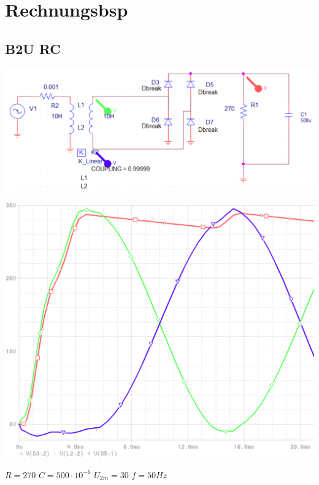 \section{Rechnungsbsp}
\subsection{B2U RC}
\begin{minipage}{0.4\linewidth}
    \includegraphics[width=\linewidth]{images/Rechnungsbsp/B2URC}
\end{minipage}
\begin{minipage}{0.2\linewidth}
    \includegraphics[width=\linewidth]{images/Rechnungsbsp/B2URCKl}
\end{minipage}
\begin{minipage}{5cm}
   $ R = 270 $ \newline
   $ C = 500 \cdot 10^{-6} $\newline
   $ U_{2m} = 30 $ \newline
   $ f = 50 Hz $   
\end{minipage}
